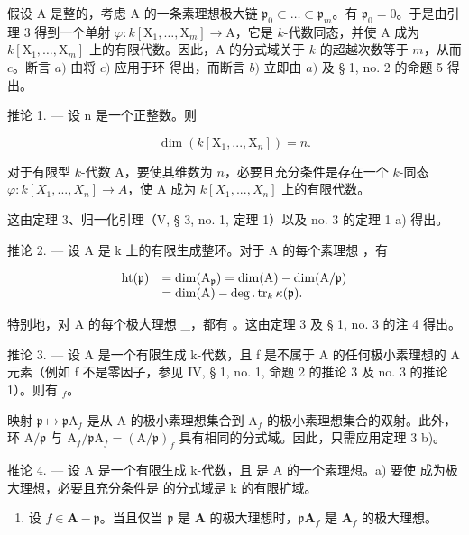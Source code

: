 假设 A 是整的，考虑 A 的一条素理想极大链 \(\mathfrak{p}_0 \subset \ldots \subset \mathfrak{p}_m\)。有 \(\mathfrak{p}_0 = 0\)。于是由引理 3 得到一个单射 \(\varphi : k[\mathrm{X}_1, \ldots, \mathrm{X}_m] \to \mathrm{A}\)，它是 \(k\)-代数同态，并使 A 成为 \(k[\mathrm{X}_1, \ldots, \mathrm{X}_m]\) 上的有限代数。因此，A 的分式域关于 \(k\) 的超越次数等于 \(m\)，从而 \(c\)。断言 \(a)\) 由将 \(c)\) 应用于环  得出，而断言 \(b)\) 立即由 \(a)\) 及 § 1, no. 2 的命题 5 得出。

推论 1. --- 设 n 是一个正整数。则

\[
\dim (k [ \mathrm{X} _ {1},..., \mathrm{X} _ {n} ]) = n.
\]

对于有限型 \(k\)-代数 A，要使其维数为 \(n\)，必要且充分条件是存在一个 \(k\)-同态 \(\varphi: k[X_1, ..., X_n] \to A\)，使 A 成为 \(k[X_1, ..., X_n]\) 上的有限代数。

这由定理 3、归一化引理（V, § 3, no. 1, 定理 1）以及 no. 3 的定理 1 a) 得出。

推论 2. --- 设 A 是 k 上的有限生成整环。对于 A 的每个素理想  ，有

\[
\begin{array}{r l} \mathrm{ht} (\mathfrak {p}) & = \dim (\mathrm{A} _ {\mathfrak {p}}) = \dim (\mathrm{A}) - \dim (\mathrm{A} / \mathfrak {p}) \\ & = \dim (\mathrm{A}) - \deg . \operatorname{tr} _ {k} \kappa (\mathfrak {p}). \end{array}
\]

特别地，对 A 的每个极大理想 \_，都有  。这由定理 3 及 § 1, no. 3 的注 4 得出。

推论 3. --- 设 A 是一个有限生成 k-代数，且 f 是不属于 A 的任何极小素理想的 A 元素（例如 f 不是零因子，参见 IV, § 1, no. 1, 命题 2 的推论 3 及 no. 3 的推论 1）。则有 \(_{f}\)。

映射 \(\mathfrak{p} \mapsto \mathfrak{p}\mathrm{A}_f\) 是从 A 的极小素理想集合到 \(\mathrm{A}_f\) 的极小素理想集合的双射。此外，环 \(\mathrm{A} / \mathfrak{p}\) 与 \(\mathrm{A}_f / \mathfrak{p}\mathrm{A}_f = (\mathrm{A} / \mathfrak{p})_f\) 具有相同的分式域。因此，只需应用定理 3 b)。

推论 4. --- 设 A 是一个有限生成 k-代数，且  是 A 的一个素理想。a) 要使  成为极大理想，必要且充分条件是  的分式域是 k 的有限扩域。

\begin{enumerate}
\def\labelenumi{\alph{enumi})}
\setcounter{enumi}{1}
\tightlist
\item
  设 \(f \in \mathbf{A} - \mathfrak{p}\)。当且仅当 \(\mathfrak{p}\) 是 \(\mathbf{A}\) 的极大理想时，\(\mathfrak{p}\mathbf{A}_f\) 是 \(\mathbf{A}_f\) 的极大理想。
\end{enumerate}

